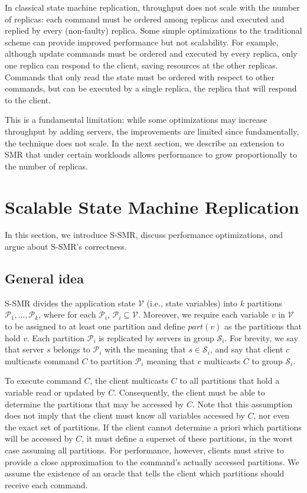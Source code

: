 \documentclass[11pt]{article}
\newcommand{\ppm}{\mathcal{P}}
\newcommand{\vvm}{\mathcal{V}}
\newcommand{\ssm}{\mathcal{S}}
\begin{document}
In classical state machine replication, throughput does not scale with the number of replicas: each command must be ordered among replicas and executed and replied by every (non-faulty) replica.
Some simple optimizations to the traditional scheme can provide improved performance but not scalability.
For example, although update commands must be ordered and executed by every replica, only one replica can respond to the client, saving resources at the other replicas.
Commands that only read the state must be ordered with respect to other commands, but can be executed by a single replica, the replica that will respond to the client.

This is a fundamental limitation: while some optimizations may increase throughput by adding servers, the improvements are limited since fundamentally, the technique does not scale.
In the next section, we describe an extension to SMR that under certain workloads allows performance to grow proportionally to the number of replicas.



\section{Scalable State Machine Replication}
\label{sec:scalablesmr}

In this section, we introduce S-SMR, discuss performance optimizations, and argue about S-SMR's correctness.

\subsection{General idea}
\label{sec:generalidea}

S-SMR divides the application state $\vvm$ (i.e., state variables) into $k$ partitions $\ppm_1, ..., \ppm_k$, where for each $\ppm_i$, $\ppm_i \subseteq \vvm$. 
Moreover, we require each variable $v$ in $\vvm$ to be assigned to at least one partition and define $part(v)$ as the partitions that hold $v$. 
Each partition $\ppm_i$ is replicated by servers in group $\ssm_i$.
For brevity, we say that server $s$ belongs to $\ppm_i$ with the meaning that $s \in \ssm_i$, and say that client $c$ multicasts command $C$ to partition $\ppm_i$ meaning that $c$ multicasts $C$ to group $\ssm_i$.

To execute command $C$, the client multicasts $C$ to all partitions that hold a variable read or updated by $C$.
Consequently, the client must be able to determine the partitions that may be accessed by $C$.
Note that this assumption does not imply that the client must know all variables accessed by $C$, nor even the exact set of partitions.
If the client cannot determine a priori which partitions will be accessed by $C$, it must define a superset of these partitions, in the worst case assuming all partitions.
For performance, however, clients must strive to provide a close approximation to the command's actually accessed partitions.
We assume the existence of an oracle that tells the client which partitions should receive each command.
\end{document}
